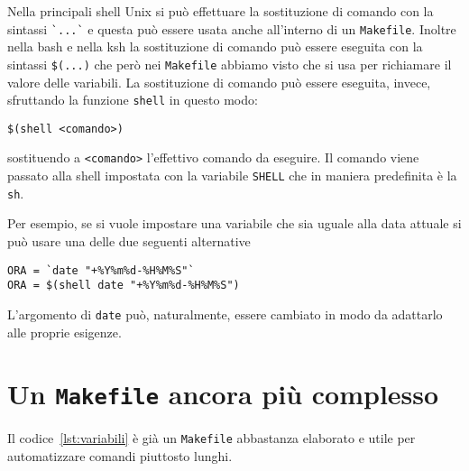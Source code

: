 Nella principali shell Unix si può effettuare la sostituzione di comando con la
sintassi \verb|`...`| e questa può essere usata anche all'interno di un
\verb|Makefile|.  Inoltre nella bash e nella ksh la sostituzione di comando può
essere eseguita con la sintassi \verb|$(...)| che però nei \verb|Makefile|
abbiamo visto che si usa per richiamare il valore delle variabili.  La
sostituzione di comando può essere eseguita, invece, sfruttando la funzione
\verb|shell| in questo modo:
\begin{lstlisting}
$(shell <comando>)
\end{lstlisting}
sostituendo a \verb|<comando>| l'effettivo comando da eseguire.  Il comando
viene passato alla shell impostata con la variabile \verb|SHELL| che in maniera
predefinita è la \verb|sh|.

Per esempio, se si vuole impostare una variabile che sia uguale alla data
attuale si può usare una delle due seguenti alternative
\begin{lstlisting}
ORA = `date "+%Y%m%d-%H%M%S"`
ORA = $(shell date "+%Y%m%d-%H%M%S")
\end{lstlisting}
L'argomento di \verb|date| può, naturalmente, essere cambiato in modo da
adattarlo alle proprie esigenze.

\section{Un \texttt{Makefile} ancora più complesso}
Il codice~\ref{lst:variabili} è già un \verb|Makefile| abbastanza elaborato e
utile per automatizzare comandi piuttosto lunghi.


